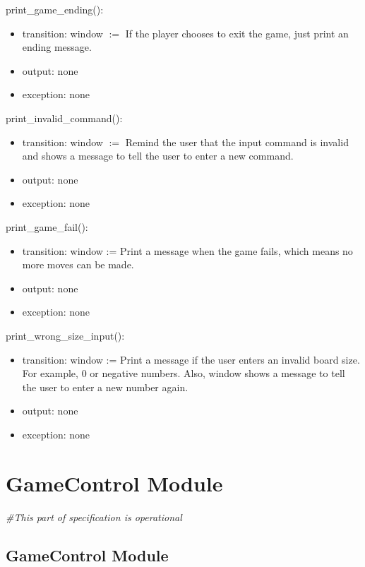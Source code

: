 \documentclass[12pt]{article}
\begin{document}
\noindent print\_game\_ending():
\begin{itemize}
\item transition: window $:=$ If the player chooses to exit the game,
just print an ending message.
\item output: none
\item exception: none
\end{itemize}

\noindent print\_invalid\_command():
\begin{itemize}
\item transition: window $:=$ Remind the user that the input
 command is 
invalid and shows a message to tell the user to enter a new command.
\item output: none
\item exception: none
\end{itemize}

\noindent print\_game\_fail():
\begin{itemize}
\item transition: window := Print a message when the game fails, 
which means no more moves can be made.
\item output: none
\item exception: none
\end{itemize}

\noindent print\_wrong\_size\_input():
\begin{itemize}
\item transition: window := Print a message if the user enters an
invalid board size. For example, 0 or negative numbers. Also, window
shows a message to tell the user to enter a new number again.
\item output: none
\item exception: none
\end{itemize}

\newpage


\section* {GameControl Module}
\textit{\#This part of specification
is operational}

\subsection* {GameControl Module}
\end{document}
